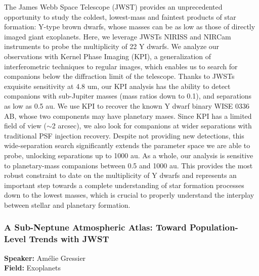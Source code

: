 The James Webb Space Telescope (JWST) provides an unprecedented opportunity to study the coldest, lowest-mass and faintest products of star formation: Y-type brown dwarfs, whose masses can be as low as those of directly imaged giant exoplanets. Here, we leverage JWSTs NIRISS and NIRCam instruments to probe the multiplicity of 22 Y dwarfs. We analyze our observations with Kernel Phase Imaging (KPI), a generalization of interferometric techniques to regular images, which enables us to search for companions below the diffraction limit of the telescope. Thanks to JWSTs exquisite sensitivity at 4.8 um, our KPI analysis has the ability to detect companions with sub-Jupiter masses (mass ratios down to 0.1), and separations as low as 0.5 au. We use KPI to recover the known Y dwarf binary WISE 0336 AB, whose two components may have planetary mases. Since KPI has a limited field of view ($\sim$2 arcsec), we also look for companions at wider separations with traditional PSF injection recovery. Despite not providing new detections, this wide-separation search significantly extends the parameter space we are able to probe, unlocking separations up to 1000 au. As a whole, our analysis is sensitive to planetary-mass companions between 0.5 and 1000 au. This provides the most robust constraint to date on the multiplicity of Y dwarfs and represents an important step towards a complete understanding of star formation processes down to the lowest masses, which is crucial to properly understand the interplay between stellar and planetary formation.

\hypertarget{abstract-talk-224}{}\label{abstract-page-talk-224}
\subsubsection*{A Sub-Neptune Atmospheric Atlas: Toward Population-Level Trends with JWST}
\textbf{Speaker:} Amélie Gressier\\
\textbf{Field:} Exoplanets

